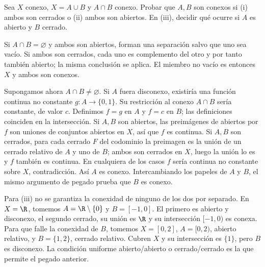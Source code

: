 \begin{ejercicio}
Sea $X$ conexo, $X=A\cup B$ y $A\cap B$ conexo. Probar que $A,B$ son conexos si (i) ambos son cerrados o (ii) ambos son abiertos. En (iii), decidir qué ocurre si $A$ es abierto y $B$ cerrado.
\end{ejercicio}
\begin{solucion}
Si $A\cap B=\varnothing$ y ambos son abiertos, forman una separación salvo que uno sea vacío. Si ambos son cerrados, cada uno es complemento del otro y por tanto también abierto; la misma conclusión se aplica. El miembro no vacío es entonces $X$ y ambos son conexos.

Supongamos ahora $A\cap B\ne\varnothing$. Si $A$ fuera disconexo, existiría una función continua no constante $g:A\to\{0,1\}$. Su restricción al conexo $A\cap B$ sería constante, de valor $c$. Definimos $f=g$ en $A$ y $f=c$ en $B$; las definiciones coinciden en la intersección. Si $A,B$ son abiertos, las preimágenes de abiertos por $f$ son uniones de conjuntos abiertos en $X$, así que $f$ es continua. Si $A,B$ son cerrados, para cada cerrado $F$ del codominio la preimagen es la unión de un cerrado relativo de $A$ y uno de $B$; ambos son cerrados en $X$, luego la unión lo es y $f$ también es continua. En cualquiera de los casos $f$ sería continua no constante sobre $X$, contradicción. Así $A$ es conexo. Intercambiando los papeles de $A$ y $B$, el mismo argumento de pegado prueba que $B$ es conexo.

Para (iii) no se garantiza la conexidad de ninguno de los dos por separado. En $X=\R$, tomemos $A=\R\setminus\{0\}$ y $B=[-1,0]$. El primero es abierto y disconexo, el segundo cerrado, su unión es $\R$ y su intersección $[-1,0)$ es conexa. Para que falle la conexidad de $B$, tomemos $X=[0,2]$, $A=[0,2)$, abierto relativo, y $B=\{1,2\}$, cerrado relativo. Cubren $X$ y su intersección es $\{1\}$, pero $B$ es disconexo. La condición uniforme abierto/abierto o cerrado/cerrado es la que permite el pegado anterior.
\end{solucion}

